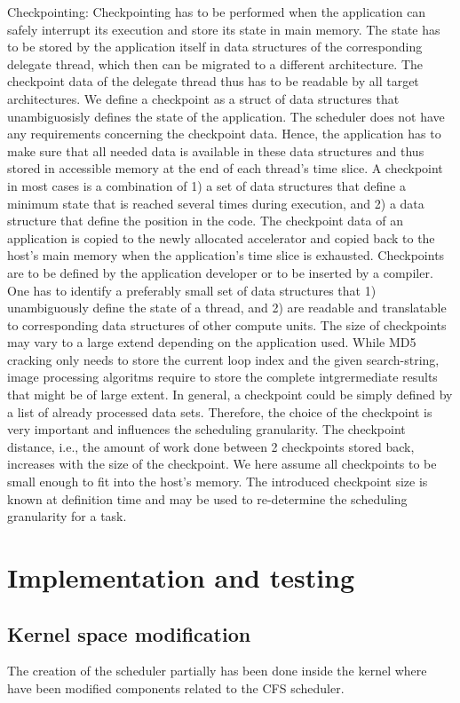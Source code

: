 \documentclass[a4paper,13pt]{article}
\begin{document}
\begin{multicols}{2}
Checkpointing: Checkpointing has to be performed when the application can safely interrupt its 
execution and store its state in main memory. The state has to be stored by the application itself
in data structures of the corresponding delegate thread, which then can be migrated to a different
architecture. The checkpoint data of the delegate thread thus has to be readable by all target 
architectures.
We define a checkpoint as a struct of data structures that unambiguosisly defines the state of the 
application. The scheduler does not have any requirements concerning the checkpoint data. Hence, the
application has to make sure that all needed data is available in these data structures and thus
stored in accessible memory at the end of each thread's time slice. A checkpoint in most cases is a
combination of 1) a set of data structures that define a minimum state that is reached several times
during execution, and 2) a data structure that define the position in the code. The checkpoint data
of an application is copied to the newly allocated accelerator and copied back to the host's main 
memory when the application's time slice is exhausted. 
Checkpoints are to be defined by the application developer or to be inserted by a compiler. One has 
to identify a preferably small set of data structures that 1) unambiguously define the state of a 
thread, and 2) are readable and translatable to corresponding data structures of other compute units.
The size of checkpoints may vary to a large extend depending on the application used. While MD5\cite{rfc1321}\cite{oai:infoscience.epfl.ch:149727} 
cracking  only needs to store the current loop index and the given search-string, image processing 
algoritms require to store the complete intgrermediate results that might be of large extent.
In general, a checkpoint could be simply defined by a list of already processed data sets. Therefore,
the choice of the checkpoint is very important and influences the scheduling granularity. The 
checkpoint distance, i.e., the amount of work done between 2 checkpoints stored back, increases with
the size of the checkpoint.
We here assume all checkpoints to be small enough to fit into the host's memory. The introduced 
checkpoint size is known at definition time and may be used to re-determine the scheduling granularity
for a task. 

\section{Implementation and testing}
\subsection{Kernel space modification}
The creation of the scheduler partially has been done inside the kernel where have been modified 
components related to the CFS scheduler.
\\


\end{multicols}
\end{document}
